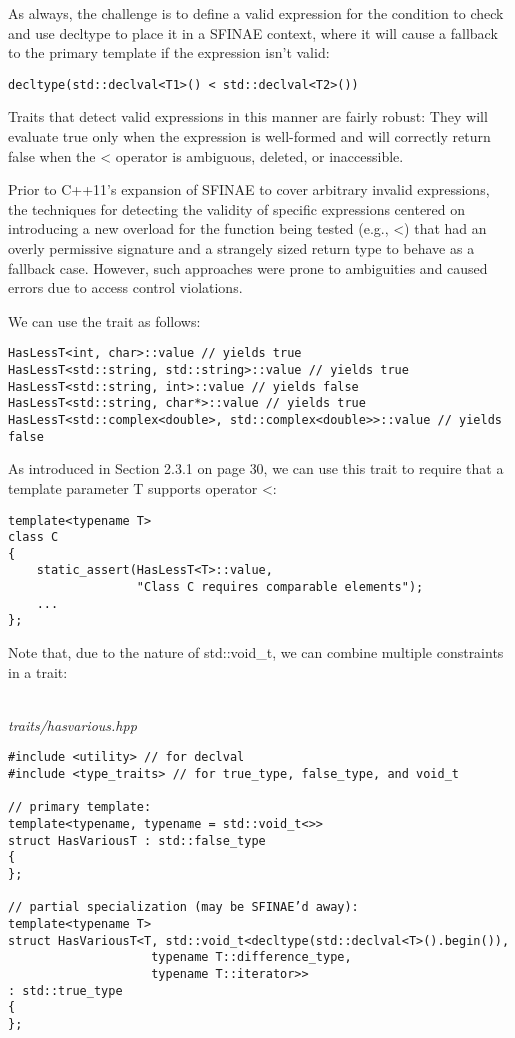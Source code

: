 As always, the challenge is to define a valid expression for the condition to check and use decltype to place it in a SFINAE context, where it will cause a fallback to the primary template if the expression isn’t valid:

\begin{lstlisting}[style=styleCXX]
decltype(std::declval<T1>() < std::declval<T2>())
\end{lstlisting}

Traits that detect valid expressions in this manner are fairly robust: They will evaluate true only when the expression is well-formed and will correctly return false when the < operator is ambiguous, deleted, or inaccessible.

\begin{tcolorbox}[colback=webgreen!5!white,colframe=webgreen!75!black]
\hspace*{0.75cm}Prior to C++11’s expansion of SFINAE to cover arbitrary invalid expressions, the techniques for detecting the validity of specific expressions centered on introducing a new overload for the function being tested (e.g., <) that had an overly permissive signature and a strangely sized return type to behave as a fallback case. However, such approaches were prone to ambiguities and caused errors due to access control violations.
\end{tcolorbox}

We can use the trait as follows:

\begin{lstlisting}[style=styleCXX]
HasLessT<int, char>::value // yields true
HasLessT<std::string, std::string>::value // yields true
HasLessT<std::string, int>::value // yields false
HasLessT<std::string, char*>::value // yields true
HasLessT<std::complex<double>, std::complex<double>>::value // yields false
\end{lstlisting}

As introduced in Section 2.3.1 on page 30, we can use this trait to require that a template parameter T supports operator <:

\begin{lstlisting}[style=styleCXX]
template<typename T>
class C
{
	static_assert(HasLessT<T>::value,
				  "Class C requires comparable elements");
	...
};
\end{lstlisting}

Note that, due to the nature of std::void\_t, we can combine multiple constraints in a trait:

\hspace*{\fill} \\ %
\noindent
\textit{traits/hasvarious.hpp}
\begin{lstlisting}[style=styleCXX]
#include <utility> // for declval
#include <type_traits> // for true_type, false_type, and void_t

// primary template:
template<typename, typename = std::void_t<>>
struct HasVariousT : std::false_type
{
};

// partial specialization (may be SFINAE’d away):
template<typename T>
struct HasVariousT<T, std::void_t<decltype(std::declval<T>().begin()),
					typename T::difference_type,
					typename T::iterator>>
: std::true_type
{
};
\end{lstlisting}


